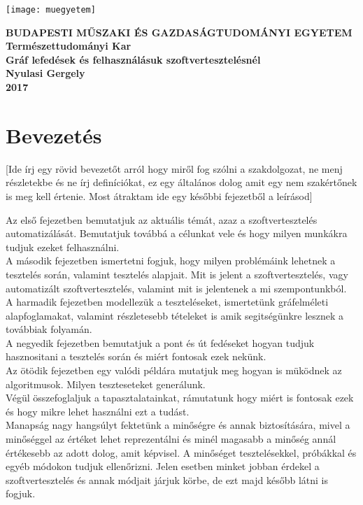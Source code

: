 \documentclass[12pt]{article}
\begin{document}
\begin{titlepage}
\centering
\texttt{[image: muegyetem]}

\bfseries\small{
BUDAPESTI MŰSZAKI ÉS GAZDASÁGTUDOMÁNYI EGYETEM
}\\
Természettudományi Kar\\
\vfill
\Large{Gráf lefedések és felhasználásuk szoftvertesztelésnél}\\
Nyulasi Gergely\\

\vfill
\vfill
2017
\end{titlepage}

\pagebreak

\tableofcontents

\pagebreak

\section{Bevezetés}
[Ide írj egy rövid bevezetőt arról hogy miről fog szólni a szakdolgozat, ne menj részletekbe és ne írj definíciókat, ez egy általános dolog amit egy nem szakértőnek is meg kell értenie. Most átraktam ide egy későbbi fejezetből a leírásod]

Az első fejezetben bemutatjuk az aktuális témát, azaz a szoftvertesztelés automatizálását. Bemutatjuk továbbá a célunkat vele és hogy milyen munkákra tudjuk ezeket felhasználni.\\
A második fejezetben ismertetni fogjuk, hogy milyen problémáink lehetnek a tesztelés során, valamint tesztelés alapjait.
 Mit is jelent a szoftvertesztelés, vagy automatizált szoftvertesztelés, valamint mit is jelentenek a mi szempontunkból.\\
A harmadik fejezetben modellezük a teszteléseket, ismertetünk gráfelméleti alapfoglamakat, valamint részletesebb tételeket is amik segitségünkre lesznek a továbbiak folyamán.\\
A negyedik fejezetben bemutatjuk a pont és út fedéseket hogyan tudjuk hasznositani a tesztelés során és miért fontosak ezek nekünk.\\
Az ötödik fejezetben egy valódi példára mutatjuk meg hogyan is müködnek az algoritmusok. Milyen teszteseteket generálunk.\\
Végül összefoglaljuk a tapasztalatainkat, rámutatunk hogy miért is fontosak ezek és hogy mikre lehet használni ezt a tudást.\\


Manapság nagy hangsúlyt fektetünk a minőségre és annak biztosítására, mivel a minőséggel az értéket lehet reprezentálni és minél magasabb a minőség annál értékesebb az adott dolog, amit képvisel. A minőséget tesztelésekkel, próbákkal és egyéb módokon tudjuk ellenőrizni.
Jelen esetben minket jobban érdekel a szoftvertesztelés és annak módjait járjuk körbe, de ezt majd később látni is fogjuk.\\
\end{document}
